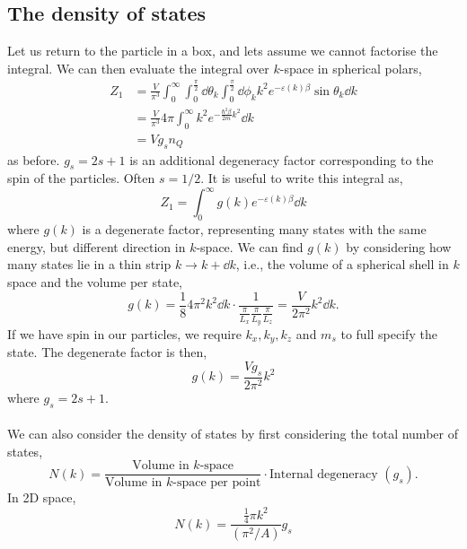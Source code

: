 \documentclass{book}
\begin{document}
\subsection{The density of states}
Let us return to the particle in a box, and lets assume we cannot factorise the integral. We can then evaluate the integral over $k$-space in spherical polars,
\begin{equation}
	\begin{split}
	Z_1 &= \frac{V}{\pi^3}\int_0^{\infty}\int_0^{\frac{\pi}{2}}\dd{\theta}_k\int_0^{\frac{\pi}{2}}\dd{\phi}_kk^2e^{-\varepsilon(k)\beta}\sin\theta_k\dd{k} \\
	& = \frac{V}{\pi^3}4\pi\int_0^{\infty}k^2e^{-\frac{\hbar^2\beta}{2m}k^2}\dd{k} \\
	& = Vg_sn_Q
	\end{split}
\end{equation}
as before. $g_s = 2s+1$ is an additional degeneracy factor corresponding to the spin of the particles. Often $s=1/2$. It is useful to write this integral as,
\begin{equation}
	Z_1 = \int_0^{\infty}g(k) e^{-\varepsilon(k)\beta}\dd{k}
\end{equation}
where $g(k)$ is a degenerate factor, representing many states with the same energy, but different direction in $k$-space. We can find $g(k)$ by considering how many states lie in a thin strip $k \to k + \dd{k}$, i.e., the volume of a spherical shell in $k$ space and the volume per state,
\begin{equation}
	g(k) = \frac{1}{8}4\pi^2k^2\dd{k}\cdot \frac{1}{\frac{\pi}{L_x}\frac{\pi}{L_y}\frac{\pi}{L_z}} = \frac{V}{2\pi^2}k^2\dd{k}.
\end{equation}
If we have spin in our particles, we require $k_x,k_y,k_z$ and $m_s$ to full specify the state. The degenerate factor is then,
\begin{equation}
	g(k) = \frac{Vg_s}{2\pi^2}k^2	
\end{equation}
where $g_s = 2s+1$.
\\\\
We can also consider the density of states by first considering the total number of states,
\begin{equation}
	N(k) = \frac{\text{Volume in $k$-space}}{\text{Volume in $k$-space per point}} \cdot \text{Internal degeneracy $(g_s)$}.
\end{equation}
In 2D space,
\begin{equation}
	N(k) = \frac{\frac{1}{4}\pi k^2}{(\pi^2/A)}g_s
\end{equation}
\end{document}
